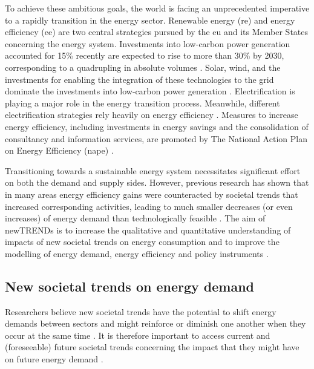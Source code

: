 To achieve these ambitious goals, the world is facing an unprecedented imperative to a rapidly transition in the energy sector. 
Renewable energy (\gls{re}) and energy efficiency (\gls{ee}) are two central strategies pursued by the \gls{eu} and its Member States concerning the energy system. 
Investments into low-carbon power generation accounted for 15\% recently are expected to rise to more than 30\% by 2030, corresponding to a quadrupling in absolute volumes \cite{shift}. Solar, wind, and the investments for enabling the integration of these technologies to the grid dominate the investments into low-carbon power generation \cite{shift}. 
Electrification is playing a major role in the energy transition process. 
Meanwhile, different electrification strategies rely heavily on energy efficiency \cite{electrification}.
Measures to increase energy efficiency, including investments in energy savings and the consolidation of consultancy and information services, are promoted by The National Action Plan on Energy Efficiency (\gls{nape}) \cite{bafa}.  

Transitioning towards a sustainable energy system necessitates significant effort on both the demand and supply sides. 
However, previous research has shown that in many areas energy efficiency gains were counteracted by societal trends that increased corresponding activities, leading to much smaller decreases (or even increases) of energy demand than technologically feasible \cite{2050}. 
The aim of newTRENDs is to increase the qualitative and quantitative understanding of impacts of new societal trends on energy consumption and to improve the modelling of energy demand, energy efficiency and policy instruments \cite{fraunhofer}. 


\subsection{New societal trends on energy demand}


Researchers believe new societal trends have the potential to shift energy demands between sectors and might reinforce or diminish one another when they occur at the same time \cite{2050}. 
It is therefore important to access current and (foreseeable) future societal trends concerning the impact that they might have on future energy demand \cite{2050}. 

